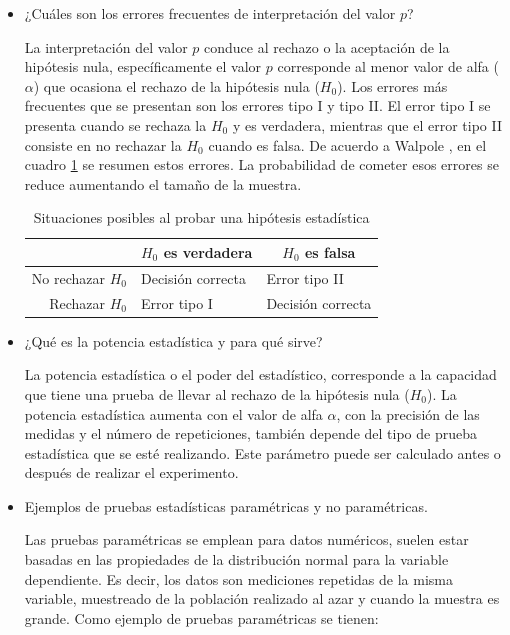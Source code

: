 \documentclass{article}
\begin{document}
\begin{itemize}
    \item ¿Cuáles son los errores frecuentes de interpretación del valor $p$?
    
    La interpretación del valor $p$ conduce al rechazo o la aceptación de la hipótesis nula, específicamente el valor $p$ corresponde al menor valor de alfa ($\alpha$) que ocasiona el rechazo de la hipótesis nula ($H_{0}$). Los errores más frecuentes que se presentan son los errores tipo I y tipo II. El error tipo I se presenta cuando se rechaza la $H_{0}$ y es verdadera, mientras que el error tipo II consiste en no rechazar la $H_{0}$ cuando es falsa. De acuerdo a Walpole \cite{walpole}, en el cuadro \ref{errores} se resumen estos errores. La probabilidad de cometer esos errores se reduce aumentando el tamaño de la muestra.
    
    \begin{table}
    \centering
    \caption{Situaciones posibles al probar una hipótesis estadística}
  \begin{tabular}{|r|l|l|}
    \hline
    \multicolumn{1}{|c|}{} & \multicolumn{1}{c|}{$H_{0}$ es verdadera} & \multicolumn{1}{c|}{$H_{0}$ es falsa} \\ \hline
    No rechazar $H_{0}$    & Decisión correcta                         & Error tipo II                         \\ \hline
    Rechazar $H_{0}$       & Error tipo I                              & Decisión correcta                     \\ \hline 
    \end{tabular}
    \label{errores}
    \end{table}

    \item ¿Qué es la potencia estadística y para qué sirve?
    
    La potencia estadística o el poder del estadístico, corresponde a la capacidad que tiene una prueba de llevar al rechazo de la hipótesis nula ($H_{0}$). La potencia estadística aumenta con el valor de alfa $\alpha$, con la precisión de las medidas y el número de repeticiones, también depende del tipo de prueba estadística que se esté realizando. Este parámetro puede ser calculado antes o después de realizar el experimento.
    
    \item Ejemplos de pruebas estadísticas paramétricas y no paramétricas.
    
    Las pruebas paramétricas se emplean para datos numéricos, suelen estar basadas en las propiedades de la distribución normal para la variable dependiente. Es decir, los datos son mediciones repetidas de la misma variable, muestreado de la población realizado al azar y cuando la muestra es grande. Como ejemplo de pruebas paramétricas se tienen:
    

\end{itemize}
\end{document}
